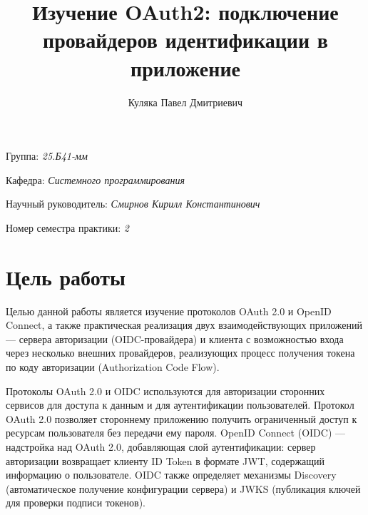\documentclass[a4paper]{article}
\title{Изучение OAuth2: подключение провайдеров идентификации в приложение}
\author{Куляка Павел Дмитриевич}
\date{}
\begin{document}
\maketitle

\begin{flushright}
    Группа: \emph{25.Б41-мм}

    Кафедра: \emph{Системного программирования}

    Научный руководитель: \emph{Смирнов Кирилл Константинович}

    Номер семестра практики: \emph{2}
\end{flushright} 


\section{Цель работы}


Целью данной работы является изучение протоколов OAuth 2.0 и OpenID Connect, а также практическая реализация двух взаимодействующих приложений --- сервера авторизации (OIDC-провайдера) и клиента с возможностью входа через несколько внешних провайдеров, реализующих процесс получения токена по коду авторизации (Authorization Code Flow).


Протоколы OAuth 2.0 и OIDC используются для авторизации сторонних сервисов для доступа к данным и для аутентификации пользователей. Протокол OAuth 2.0 позволяет стороннему приложению получить ограниченный доступ к ресурсам пользователя без передачи ему пароля. OpenID Connect (OIDC) --- надстройка над OAuth 2.0, добавляющая слой аутентификации: сервер авторизации возвращает клиенту ID Token в формате JWT, содержащий информацию о пользователе. OIDC также определяет механизмы Discovery (автоматическое получение конфигурации сервера) и JWKS (публикация ключей для проверки подписи токенов). 
\end{document}

